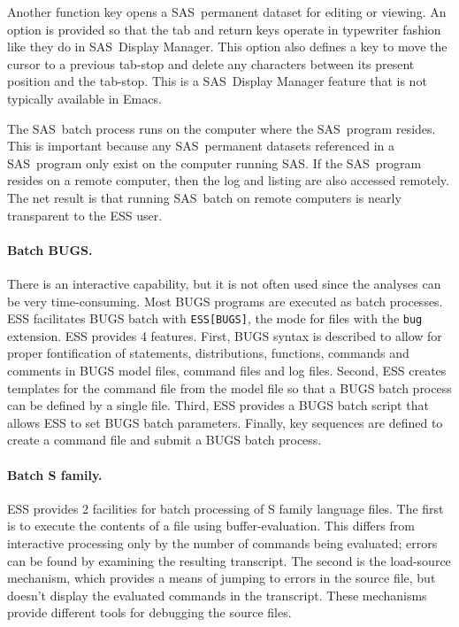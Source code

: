 \documentclass{article}
\newcommand*{\SAS}{\textsc{SAS}}
\newcommand{\stexttt}[1]{{\small\texttt{#1}}}
\begin{document}
Another function key opens a \SAS\ permanent dataset for editing or
viewing.  An option is provided so that the tab and return keys
operate in typewriter fashion like they do in \SAS\ Display Manager.
This option also defines a key to move the cursor to a previous
tab-stop and delete any characters between its present position and
the tab-stop.  This is a \SAS\ Display Manager feature that is not
typically available in Emacs.

The \SAS\ batch process runs on the computer where the \SAS\ program
resides.  This is important because any \SAS\ permanent datasets
referenced in a \SAS\ program only exist on the computer running \SAS.
If the \SAS\ program resides on a remote computer, then the
log and listing are also accessed remotely.  The net result is that
running \SAS\ batch on remote computers is nearly transparent to the
ESS user.

\paragraph{Batch BUGS.}
There is
an interactive capability, but it is not often used since the analyses
can be very time-consuming.  Most BUGS programs are executed as batch
processes.  ESS facilitates BUGS batch with \stexttt{ESS[BUGS]}, the
mode for files with the \stexttt{bug} extension.  ESS provides 4
features.  First, BUGS syntax is described to allow for proper
fontification of statements, distributions, functions, commands and
comments in BUGS model files, command files and log files.  Second,
ESS creates templates for the command file from the model file so that
a BUGS batch process can be defined by a single file.  Third, ESS
provides a BUGS batch script that allows ESS to set BUGS batch
parameters.  Finally, key sequences are defined to create a command
file and submit a BUGS batch process.

\paragraph{Batch S family.}
ESS provides 2 facilities for batch processing of S family language files.
The first is to execute the contents of a file using buffer-evaluation.  This
differs from interactive processing only by the number of commands
being evaluated; errors can be found by examining the resulting
transcript.  The second is the load-source mechanism, which provides a
means of jumping to errors in the source file, but doesn't display the
evaluated commands in the transcript.  These mechanisms provide
different tools for debugging the source files.
\end{document}
